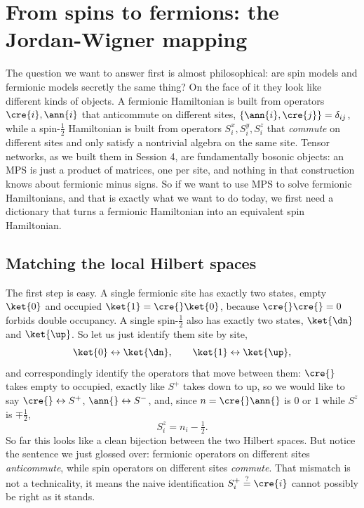 \documentclass[all_sessions.tex]{subfiles}
\begin{document}
\section{From spins to fermions: the Jordan-Wigner mapping}
\label{sec:jw}
The question we want to answer first is almost philosophical: are spin models and fermionic models
secretly the same thing? On the face of it they look like different kinds of objects. A fermionic
Hamiltonian is built from operators $\cre{i},\ann{i}$ that anticommute on different sites,
$\{\ann{i},\cre{j}\}=\delta_{ij}$, while a spin-$\tfrac12$ Hamiltonian is built from operators
$S_i^x,S_i^y,S_i^z$ that \emph{commute} on different sites and only satisfy a nontrivial algebra
on the same site. Tensor networks, as we built them in Session 4, are fundamentally bosonic
objects: an MPS is just a product of matrices, one per site, and nothing in that construction knows
about fermionic minus signs. So if we want to use MPS to solve fermionic Hamiltonians, and that is
exactly what we want to do today, we first need a dictionary that turns a fermionic Hamiltonian into
an equivalent spin Hamiltonian.

\subsection{Matching the local Hilbert spaces}
The first step is easy. A single fermionic site has exactly two states, empty $\ket{0}$ and
occupied $\ket{1}=\cre{}\ket{0}$, because $\cre{}\cre{}=0$ forbids double occupancy. A single
spin-$\tfrac12$ also has exactly two states, $\ket{\dn}$ and $\ket{\up}$. So let us just identify
them site by site,
\begin{equation}
  \ket{0} \leftrightarrow \ket{\dn}, \qquad \ket{1} \leftrightarrow \ket{\up},
\end{equation}
and correspondingly identify the operators that move between them: $\cre{}$ takes empty to occupied,
exactly like $S^+$ takes down to up, so we would like to say $\cre{}\leftrightarrow S^+$,
$\ann{}\leftrightarrow S^-$, and, since $n=\cre{}\ann{}$ is $0$ or $1$ while $S^z$ is $\mp\tfrac12$,
\begin{equation}
  S_i^z = n_i - \tfrac12.
\end{equation}
So far this looks like a clean bijection between the two Hilbert spaces. But notice the sentence we
just glossed over: fermionic operators on different sites \emph{anticommute}, while spin operators
on different sites \emph{commute}. That mismatch is not a technicality, it means the naive
identification $S_i^+\stackrel{?}{=}\cre{i}$ cannot possibly be right as it stands.
\end{document}

